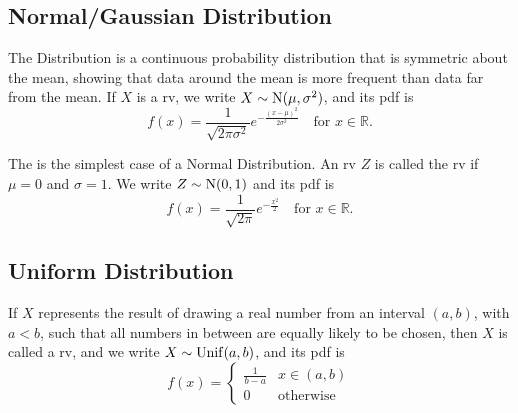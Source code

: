 \documentclass[notoc,notitlepage]{tufte-book}
\begin{document}
\subsection{Normal/Gaussian Distribution}
\label{sub:normal_gaussian_distribution}

\begin{defn}\label{defn:normal_gaussian_rv}
  The  Distribution is a continuous probability distribution that is symmetric about the mean, showing that data around the mean is more frequent than data far from the mean. If $X$ is a  rv, we write $X \sim \operatorname{N}(\mu, \sigma^2)$, and its pdf is
  \begin{equation*}
    f(x) = \frac{1}{\sqrt{2 \pi \sigma^2}} e^{- \frac{(x - \mu)^2}{2 \sigma^2}} \quad \text{for } x \in \mathbb{R}.
  \end{equation*}
\end{defn}

\begin{defn}\label{defn:standard_normal_distribution}
  The  is the simplest case of a Normal Distribution. An rv $Z$ is called the  rv if $\mu = 0$ and $\sigma = 1$. We write $Z \sim \operatorname{N}(0, 1)$ and its pdf is
  \begin{equation*}
    f(x) = \frac{1}{\sqrt{2 \pi}} e^{- \frac{x^2}{2}} \quad \text{for } x \in \mathbb{R}.
  \end{equation*}
\end{defn}


\subsection{Uniform Distribution}
\label{sub:uniform_distribution}

\begin{defn}[Uniform RV]\label{defn:uniform_rv}
  If $X$ represents the result of drawing a real number from an interval $(a, b)$, with $a < b$, such that all numbers in between are equally likely to be chosen, then $X$ is called a  rv, and we write $X \sim \operatorname{Unif}(a, b)$, and its pdf is
  \begin{equation*}
    f(x) = \begin{cases} 
      \frac{1}{b - a} & x \in (a, b) \\
      0               & \text{otherwise}
    \end{cases}
  \end{equation*}
\end{defn}
\end{document}
